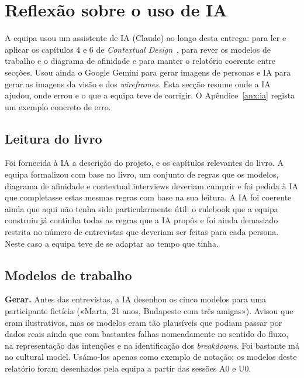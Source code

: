 \section{Reflexão sobre o uso de IA}\label{sec:reflexao}

A equipa usou um assistente de IA (Claude) ao longo desta entrega: para ler e aplicar os 
capítulos 4 e 6 de \textit{Contextual Design}~\cite{beyer1998},  
para rever os modelos de trabalho e o diagrama de afinidade e para manter o relatório coerente entre secções.
Usou ainda o Google Gemini para gerar imagens de personas e IA para gerar as imagens da visão e dos \textit{wireframes}.
Esta secção resume onde a IA ajudou, onde errou e o que a equipa teve de corrigir. O Apêndice~\ref{anx:ia} regista 
um exemplo concreto de erro.

\subsection{Leitura do livro}

Foi fornecida à IA a descrição do projeto, e os capítulos relevantes do livro. A equipa
formalizou com base no livro, um conjunto de regras que os modelos, diagrama de afinidade e contextual interviews deveriam cumprir e foi pedida
à IA que completasse estas mesmas regras com base na sua leitura. A IA foi coerente ainda que aqui
não tenha sido particularmente útil: o rulebook que a equipa construiu já continha todas as regras que a IA propôs e foi 
ainda demasiado restrita no número de entrevistas que deveriam ser feitas para cada persona. Neste caso a equipa teve de 
se adaptar ao tempo que tinha.

\subsection{Modelos de trabalho}

\textbf{Gerar.} Antes das entrevistas, a IA desenhou os cinco modelos para uma participante fictícia («Marta, 21 anos, Budapeste 
com três amigas»). Avisou que eram ilustrativos, mas os modelos eram tão plausíveis que podiam passar por dados reais ainda que com bastantes falhas
nomeadamente no sentido do fluxo, na representação das intenções e na identificação dos \textit{breakdowns}. Foi bastante má no cultural model. Usámo-los apenas 
como exemplo de notação; os modelos deste relatório foram desenhados pela equipa a partir das sessões A0 e U0.

